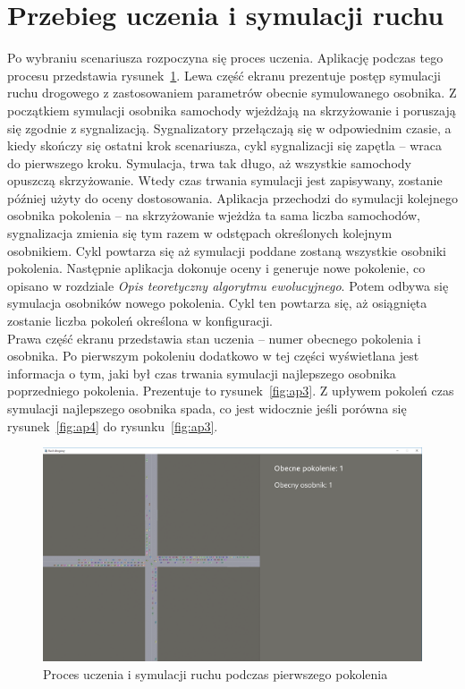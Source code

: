 \section*{Przebieg uczenia i symulacji ruchu}
Po wybraniu scenariusza rozpoczyna się proces uczenia. Aplikację podczas tego procesu przedstawia rysunek~\ref{fig:ap2}. Lewa część ekranu prezentuje postęp symulacji ruchu drogowego z zastosowaniem parametrów obecnie symulowanego osobnika. Z początkiem symulacji osobnika samochody wjeżdżają na skrzyżowanie i poruszają się zgodnie z sygnalizacją. Sygnalizatory przełączają się w odpowiednim czasie, a kiedy skończy się ostatni krok scenariusza, cykl sygnalizacji się zapętla -- wraca do pierwszego kroku. Symulacja, trwa tak długo, aż wszystkie samochody opuszczą skrzyżowanie. Wtedy czas trwania symulacji jest zapisywany, zostanie później użyty do oceny dostosowania. Aplikacja przechodzi do symulacji kolejnego osobnika pokolenia -- na skrzyżowanie wjeżdża ta sama liczba samochodów, sygnalizacja zmienia się tym razem w odstępach określonych kolejnym osobnikiem. Cykl powtarza się aż symulacji poddane zostaną wszystkie osobniki pokolenia. Następnie aplikacja dokonuje oceny i generuje nowe pokolenie, co opisano w rozdziale \textit{Opis teoretyczny algorytmu ewolucyjnego}. Potem odbywa się symulacja osobników nowego pokolenia. Cykl ten powtarza się, aż osiągnięta zostanie liczba pokoleń określona w konfiguracji. \\
Prawa część ekranu przedstawia stan uczenia -- numer obecnego pokolenia i osobnika. Po pierwszym pokoleniu dodatkowo w tej części wyświetlana jest informacja o tym, jaki był czas trwania symulacji najlepszego osobnika poprzedniego pokolenia. Prezentuje to rysunek~\ref{fig:ap3}. Z upływem pokoleń czas symulacji najlepszego osobnika spada, co jest widocznie jeśli porówna się rysunek~\ref{fig:ap4} do rysunku~\ref{fig:ap3}.
\begin{figure}[h]
	\centering
	\includegraphics[width=1\linewidth]{ap2}
	\caption[Proces uczenia i symulacji ruchu]{Proces uczenia i symulacji ruchu podczas pierwszego pokolenia}
	\label{fig:ap2}
\end{figure}
